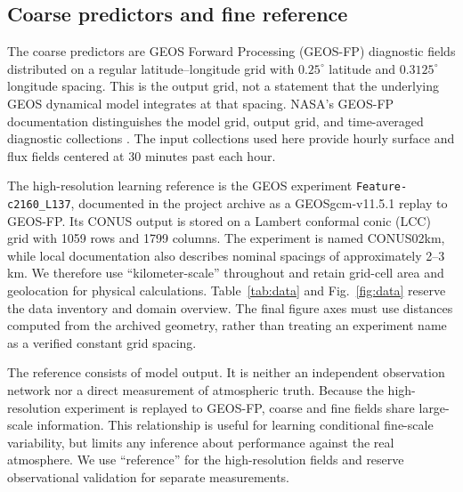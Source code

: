 \documentclass[10pt]{article}
\newcommand{\code}[1]{{\small\nolinkurl{#1}}}
\newcommand{\blankpanel}[1]{\begingroup\setlength{\fboxsep}{0pt}\color{rulegray}\fbox{\rule{0pt}{#1}\rule{\dimexpr\linewidth-2\fboxrule\relax}{0pt}}\endgroup}
\newcommand{\tableslot}[3]{\begin{table}[t]\caption{#2}\label{#3}\centering\blankpanel{#1}\end{table}}
\begin{document}
\subsection{Coarse predictors and fine reference}
The coarse predictors are GEOS Forward Processing (GEOS-FP) diagnostic fields distributed on a regular latitude--longitude grid with $0.25^\circ$ latitude and $0.3125^\circ$ longitude spacing. This is the output grid, not a statement that the underlying GEOS dynamical model integrates at that spacing. NASA's GEOS-FP documentation distinguishes the model grid, output grid, and time-averaged diagnostic collections \citep{geosfp}. The input collections used here provide hourly surface and flux fields centered at 30 minutes past each hour.

The high-resolution learning reference is the GEOS experiment \code{Feature-c2160_L137}, documented in the project archive as a GEOSgcm-v11.5.1 replay to GEOS-FP. Its CONUS output is stored on a Lambert conformal conic (LCC) grid with 1059 rows and 1799 columns. The experiment is named CONUS02km, while local documentation also describes nominal spacings of approximately 2--3 km. We therefore use ``kilometer-scale'' throughout and retain grid-cell area and geolocation for physical calculations. Table~\ref{tab:data} and Fig.~\ref{fig:data} reserve the data inventory and domain overview. The final figure axes must use distances computed from the archived geometry, rather than treating an experiment name as a verified constant grid spacing.

The reference consists of model output. It is neither an independent observation network nor a direct measurement of atmospheric truth. Because the high-resolution experiment is replayed to GEOS-FP, coarse and fine fields share large-scale information. This relationship is useful for learning conditional fine-scale variability, but limits any inference about performance against the real atmosphere. We use ``reference'' for the high-resolution fields and reserve observational validation for separate measurements.

\tableslot{2.6cm}{Data sources and target definitions. Reserved for the GEOS-FP and high-resolution GEOS collections, variables, units, spatial support, temporal support, and available timestamps. Distinguish the distributed GEOS-FP grid from its model grid, and instantaneous state targets from approximate hourly precipitation means. Table body intentionally blank.}{tab:data}
\end{document}
